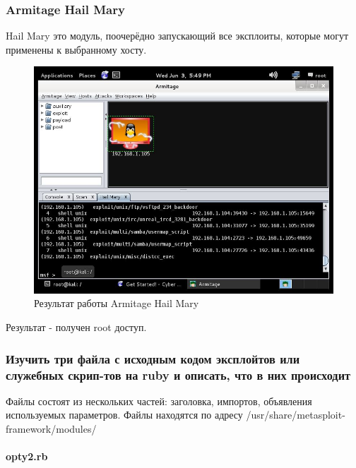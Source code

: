 \documentclass[10pt,a4paper]{article}
\begin{document}
\subsubsection{Armitage Hail Mary}

Hail Mary это модуль, поочерёдно запускающий все эксплоиты, которые могут применены к выбранному хосту.


\begin{figure}[h!]
\centering
\includegraphics[scale=0.4]{Armitage.JPG}
\caption{Результат работы Armitage Hail Mary}
\end{figure}

Результат - получен root доступ.
 
 
\subsubsection{Изучить три файла с исходным кодом эксплойтов или служебных скрип-тов на ruby и описать, что в них происходит} 

Файлы состоят из нескольких частей: заголовка, импортов, объявления используемых параметров.
Файлы находятся по адресу /usr/share/metasploit-framework/modules/

\paragraph{opty2.rb}
\end{document}
